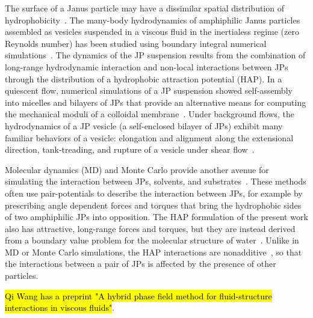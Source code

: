 \documentclass[prb,preprint,showpacs,preprintnumbers,amsmath,amssymb,longbibliography]{revtex4-1}
\begin{document}
The surface of a Janus particle may have a dissimilar spatial
distribution of hydrophobicity~\cite{doi:10.1021/la503455h}. The
many-body hydrodynamics of amphiphilic Janus particles assembled as
vesicles suspended in a viscous fluid in the inertialess regime (zero
Reynolds number) has been studied using boundary integral numerical
simulations~\cite{Fu20,Fu2022_JFM}. The dynamics of the JP suspension
results from the combination of long-range hydrodynamic interaction and
non-local interactions between JPs through the distribution of a
hydrophobic attraction potential (HAP).
%
In a quiescent flow, numerical simulations of a JP suspension showed
self-assembly into micelles and bilayers of JPs that provide an
alternative means for computing the mechanical moduli of a colloidal
membrane~\cite{NaTr00, Fu20, KrFiGuKaHa13}. Under background flows, the
hydrodynamics of a JP vesicle (a self-enclosed bilayer of JPs) exhibit
many familiar behaviors of a vesicle: elongation and alignment along the
extensional direction, tank-treading, and rupture of a vesicle under
shear flow~\cite{Fu2022_JFM, grandmaison_brancherie_salsac_2021,
D2SM00179A,keller_skalak_1982, Finken08, Shaqfeh11}.

Molecular dynamics (MD) and Monte Carlo provide another avenue for
simulating the interaction between JPs, solvents, and
substrates~\cite{Brandner2019, Baniketal2021,
HongCacciutoLuijtenGranick2008, C9NR05885K}. These methods often use
pair-potentials to describe the interaction between JPs, for example by
prescribing angle dependent forces and torques that bring the
hydrophobic sides of two amphiphilic JPs into opposition. The HAP
formulation of the present work also has attractive, long-range forces
and torques, but they are instead derived from a boundary value problem
for the molecular structure of water~\cite{Ma77, GoHaKo94, ErLjCl89,
Lietal05, Israelachvili80}. Unlike in MD or Monte Carlo simulations, the
HAP interactions are nonadditive~\cite{Fu20}, so that the interactions
between a pair of JPs is affected by the presence of other particles. 

\hl{Qi Wang has a preprint "A hybrid phase field method for fluid-structure interactions in viscous fluids"}.
\end{document}
